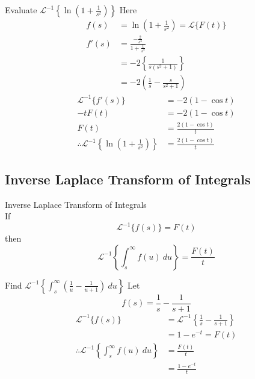 \documentclass[12pt]{article}
\newcommand{\Lap}{\mathscr{L}}
\newcommand{\Lapinv}{\mathscr{L}^{-1}}
\begin{document}
\begin{example}{Evaluate $\displaystyle \Lapinv \left\{ \ln{\left( 1+\frac{1}{s^2} \right) } \right\}$}{}
    Here
    \begin{align*}
        f(s) &= \ln{\left( 1 + \frac{1}{s^2} \right) } = \Lap \{ F(t) \} \\
        f'(s) &= \frac{-\frac{2}{s^3}}{1+\frac{1}{s^2}} \\
        &= -2 \left\{ \frac{1}{s(s^2+1)} \right\} \\
        &= -2 \left( \frac{1}{s} - \frac{s}{s^2+1} \right)
    \end{align*}
    \begin{align*}
        \Lapinv \{ f'(s) \} &= -2 (1-\cos{t}) \\
        -t F(t) &= -2 (1-\cos{t}) \\
        F(t) &= \frac{2(1-\cos{t})}{t} \\
        \therefore \Lapinv \left\{ \ln{\left( 1 + \frac{1}{s^2} \right)} \right\} &= \frac{2(1-\cos{t})}{t}
    \end{align*}
\end{example}


\subsection{Inverse Laplace Transform of Integrals}

\begin{theorem}{Inverse Laplace Transform of Integrals}{}
    \\If \[
        \Lapinv \{ f(s) \} = F(t)
    \] then \[
        \Lapinv \left\{ \int_{s}^{\infty} {f(u)} \: d{u} \right\} = \frac{F(t)}{t}
    \]
\end{theorem}

\begin{example}{Find $\displaystyle \Lapinv \left\{ \int_{s}^{\infty} {\left( \frac{1}{u} - \frac{1}{u+1} \right)} \: d{u} \right\}$}{}
    Let \[
        f(s) = \frac{1}{s} - \frac{1}{s+1}
    \]
    \begin{align*}
        \Lapinv \{ f(s) \} &= \Lapinv \left\{ \frac{1}{s} - \frac{1}{s+1} \right\} \\
        &= 1 - e^{-t} = F(t) \\
        \therefore \Lapinv \left\{ \int_{s}^{\infty} {f(u)} \: d{u} \right\} &= \frac{F(t)}{t} \\
        &= \frac{1-e^{-t}}{t}
    \end{align*}
\end{example}
\end{document}
